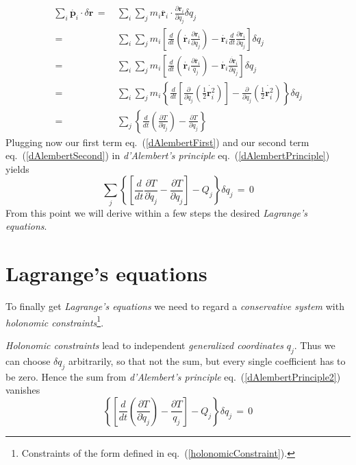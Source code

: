 \documentclass{report}
\renewcommand{\vec}[1]{\mathbf{#1}}
\begin{document}
\begin{equation}
  \label{dAlembertSecond}
  \begin{aligned}
    \sum_i \dot{\vec p_i} \cdot \delta \vec r \,=\,& \sum_i \sum_j m_i \ddot{\vec
r_i} \cdot \frac{\partial \vec r_i}{\partial q_j} \delta q_j \\
    \,=\,& \sum_i \sum_j m_i \left[\frac{d}{dt}\left(\dot{\vec r_i}  \frac{\partial \vec r_i}{\partial
q_j}\right) - \dot{\vec r_i} \frac{d}{dt} \frac{\partial \vec r_i}{\partial q_j} \right] \delta q_j
\\
    \,=\,& \sum_i \sum_j m_i \left[\frac{d}{dt} \left(\dot{\vec r_i} \frac{\partial
\dot{\vec r_i}}{\dot{q_j}}\right) - \dot{\vec r_i} \frac{\dot{\partial \vec
r_i}}{\partial q_j}\right] \delta q_j \\
    \,=\,& \sum_i \sum_j m_i \left\{\frac{d}{dt} \left[ \frac{\partial}{\partial
\dot q_j}\left(\frac{1}{2} \dot{\vec r_i^2}\right)\right] - \frac{\partial}{\partial
q_j} \left(\frac{1}{2} \dot{\vec r_i^2} \right)\right\} \delta q_j \\
    \,=\,& \sum_j \left\{ \frac{d}{dt} \left(\frac{\partial T}{\partial \dot
q_j}\right) - \frac{\partial T}{\partial q_j} \right\} 
  \end{aligned}
\end{equation}
Plugging now our first term eq.~(\ref{dAlembertFirst}) and our second term
eq.~(\ref{dAlembertSecond}) in \textit{d'Alembert's principle}
eq.~(\ref{dAlembertPrinciple}) yields 
\begin{equation}
  \label{dAlembertPrinciple2}
  \sum_j \left\{ \left[\frac{d}{dt} \frac{\partial T}{\partial \dot q_j} -
\frac{\partial T}{\partial q_j}\right] - Q_j \right\} \delta q_j \,=\, 0
\end{equation}
From this point we will derive within a few steps the desired
\textit{Lagrange's equations}.

\section{Lagrange's equations}
To finally get \textit{Lagrange's equations} we need to regard a
\textit{conservative system} with \textit{holonomic
constraints}\footnote{Constraints of the form defined in
eq.~(\ref{holonomicConstraint}).}. 

\textit{Holonomic constraints} lead to independent \textit{generalized
coordinates} $q_j$. Thus we can choose $\delta q_j$ arbitrarily, so that not
the sum, but every single coefficient has to be zero. Hence the sum from
\textit{d'Alembert's principle} eq.~(\ref{dAlembertPrinciple2}) vanishes
\begin{equation}
  \left\{ \left[\frac{d}{dt} \left(\frac{\partial T}{\partial \dot q_j} \right) -
\frac{\partial T}{q_j} \right]- Q_j \right\} \delta q_j \,=\, 0
\end{equation}
\end{document}
